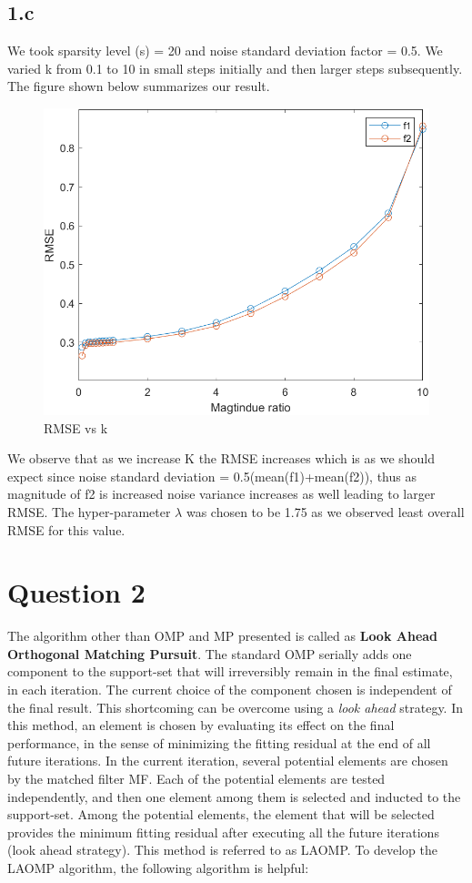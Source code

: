 \documentclass[12pt]{article}
\begin{document}
\subsection*{1.c}
We took sparsity level (s) = 20 and noise standard deviation factor = 0.5. We varied k from 0.1 to 10 in small steps initially and then larger steps subsequently. The figure shown below summarizes our result.
\begin{figure}[H]
	\centering
	\includegraphics[scale=0.75]{rmse_mag.png}  %
	\caption{RMSE vs k}
	\label{fig:2}
\end{figure}
We observe that as we increase K the RMSE increases which is as we should expect since noise standard deviation = 0.5(mean(f1)+mean(f2)), thus as magnitude of f2 is increased noise variance increases as well leading to larger RMSE. The hyper-parameter $\lambda$ was chosen to be 1.75 as we observed least overall RMSE for this value.
	\section*{Question 2}
	The algorithm other than OMP and MP presented is called as \textbf{Look Ahead Orthogonal Matching Pursuit}. The standard OMP serially adds one component to the support-set that will irreversibly remain in the final estimate, in each iteration. The current choice of the component chosen is independent of the final result. This shortcoming can be overcome using a \textit{look ahead} strategy. In this method, an element is chosen by evaluating its effect on the final performance, in the sense of minimizing the fitting residual at the end of all future iterations. In the current iteration, several potential elements are chosen by the matched filter MF. Each of the potential elements are tested independently, and then one element among them is selected and inducted to the support-set. Among the potential elements, the element that will be selected provides the minimum fitting residual after executing all the future iterations (look ahead strategy). This method is referred to as LAOMP. To develop the LAOMP algorithm, the following algorithm is helpful:
	
\end{document}
